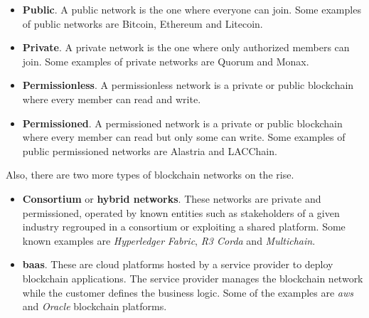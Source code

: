 \documentclass[a4paper, 12pt]{article} %
\begin{document}
            \begin{itemize}
                \item \textbf{Public}. A public network is the one where everyone can join. Some examples of public networks are Bitcoin, Ethereum and Litecoin.
                \item \textbf{Private}. A private network is the one where only authorized members can join. Some examples of private networks are Quorum and Monax.
                \item \textbf{Permissionless}. A permissionless network is a private or public blockchain where every member can read and write.
                \item \textbf{Permissioned}. A permissioned network is a private or public blockchain where every member can read but only some can write. Some examples of public permissioned networks are Alastria and LACChain.
            \end{itemize}          
            Also, there are two more types of blockchain networks on the rise.
            \begin{itemize}
                \item \textbf{Consortium} or \textbf{hybrid networks}. These networks are private and permissioned, operated by known entities such as stakeholders of a given industry regrouped in a consortium or exploiting a shared platform. Some known examples are \textit{Hyperledger} \textit{Fabric}, \textit{R3 Corda} and \textit{Multichain}.
                \item \textbf{\acrfull{baas}}. These are cloud platforms hosted by a service provider to deploy blockchain applications. The service provider manages the blockchain network while the customer defines the business logic. Some of the examples are \textit{\acrfull{aws}} and \textit{Oracle} blockchain platforms.
            \end{itemize}
            
\end{document}
